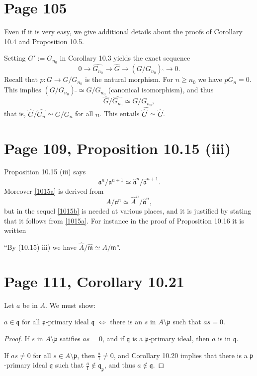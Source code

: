 \documentclass[parskip=half]{scrartcl}%
\newcommand{\mf}{\mathfrak}
\begin{document}
\section{Page 105}%

Even if it is very easy, we give additional details about the proofs of Corollary 10.4 and Proposition 10.5. 

Setting $G':=G_{n_0}$ in Corollary 10.3 yields the exact sequence
$$
0\to\widehat{G_{n_0}}\to\widehat G\to(G/G_{n_0})\ \widehat{}\to0.
$$ 
Recall that $p:G\to G/G_{n_0}$ is the natural morphism. For $n\ge n_0$ we have $pG_n=0$. This implies $(G/G_{n_0})\ \widehat{}\simeq G/G_{n_0}$ (canonical isomorphism), and thus 
$$
\widehat G/\widehat{G_{n_0}}\simeq G/G_{n_0},
$$ 
that is, $\widehat G/\widehat{G_n}\simeq G/G_n$ for all $n$. This entails $\widehat{\widehat G\,}\simeq\widehat G$.

\section{Page 109, Proposition 10.15 (iii)}%

Proposition 10.15 (iii) says 
\begin{equation}\label{1015a}
\mf a^n/\mf a^{n+1}\simeq\hat{\mf a}^n/\hat{\mf a}^{n+1}.
\end{equation}
Moreover \eqref{1015a} is derived from 
\begin{equation}\label{1015b}
A/\mf a^n\simeq\hat A^n/\hat{\mf a}^n,
\end{equation} 
but in the sequel \eqref{1015b} is needed at various places, and it is justified by stating that it follows from \eqref{1015a}. For instance in the proof of Proposition 10.16 it is written

``By (10.15) iii) we have $\hat A/\hat{\mf m}\simeq A/\mf m$''.

\section{Page 111, Corollary 10.21}%

Let $a$ be in $A$. We must show: 

$a\in\mf q$ for all $\mf p$-primary ideal $\mf q$ $\iff$ there is an $s$ in $A\setminus\mf p$ such that $as=0$. 

\begin{proof} 
If $s$ in $A\setminus\mf p$ satifies $as=0$, and if $\mf q$ is a $\mf p$-primary ideal, then $a$ is in $\mf q$.

If $as\neq0$ for all $s\in A\setminus\mf p$, then $\frac a1\neq0$, and Corollary 10.20 implies that there is a $\mf p$-primary ideal $\mf q$ such that $\frac a1\notin\mf q_{\mf p}$, and thus $a\notin\mf q$. 
\end{proof}
\end{document}
